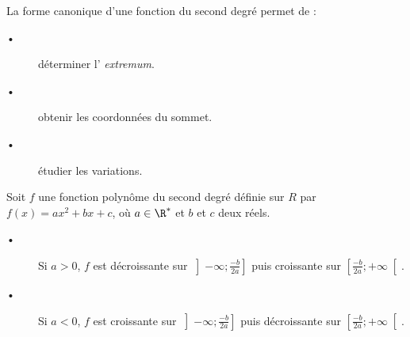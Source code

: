\begin{Rq}
La forme canonique d'une fonction du second degré permet de :

\begin{description}
\item[•] déterminer l' \textit{extremum}.
\item[•] obtenir les coordonnées du sommet.
\item[•] étudier les variations.
\end{description}
\end{Rq}



\begin{Pp}
Soit $f$ une fonction polynôme du second degré définie sur $R$ par $f(x) = ax^2+bx+c$, où $a \in \R^*$ et $b$ et $c$ deux réels.
\begin{description}
\item[•] Si $a>0$, $f$ est décroissante sur $\left]-\infty; \frac{-b}{2a} \right]$ puis croissante sur $\left[\frac{-b}{2a};+\infty \right[$.
\item[•] Si $a<0$, $f$ est croissante sur $\left]-\infty; \frac{-b}{2a} \right]$ puis décroissante sur $\left[\frac{-b}{2a};+\infty \right[$.
\end{description}
\end{Pp}

\ROC



\vspace{0.4cm}






\begin{DTL}

\end{DTL}
